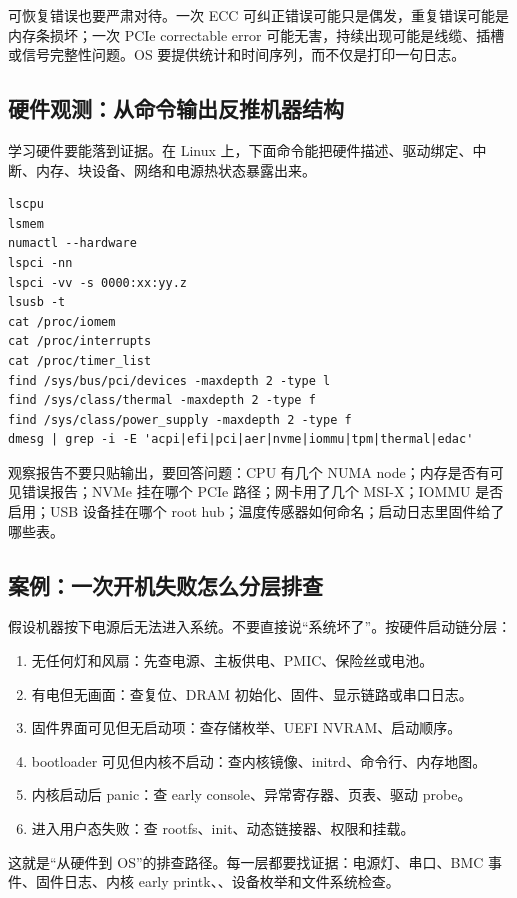 可恢复错误也要严肃对待。一次 ECC 可纠正错误可能只是偶发，重复错误可能是内存条损坏；一次 PCIe correctable error 可能无害，持续出现可能是线缆、插槽或信号完整性问题。OS 要提供统计和时间序列，而不仅是打印一句日志。

\subsection{硬件观测：从命令输出反推机器结构}

学习硬件要能落到证据。在 Linux 上，下面命令能把硬件描述、驱动绑定、中断、内存、块设备、网络和电源热状态暴露出来。

\begin{lstlisting}
lscpu
lsmem
numactl --hardware
lspci -nn
lspci -vv -s 0000:xx:yy.z
lsusb -t
cat /proc/iomem
cat /proc/interrupts
cat /proc/timer_list
find /sys/bus/pci/devices -maxdepth 2 -type l
find /sys/class/thermal -maxdepth 2 -type f
find /sys/class/power_supply -maxdepth 2 -type f
dmesg | grep -i -E 'acpi|efi|pci|aer|nvme|iommu|tpm|thermal|edac'
\end{lstlisting}

观察报告不要只贴输出，要回答问题：CPU 有几个 NUMA node；内存是否有可见错误报告；NVMe 挂在哪个 PCIe 路径；网卡用了几个 MSI-X；IOMMU 是否启用；USB 设备挂在哪个 root hub；温度传感器如何命名；启动日志里固件给了哪些表。

\subsection{案例：一次开机失败怎么分层排查}

假设机器按下电源后无法进入系统。不要直接说“系统坏了”。按硬件启动链分层：

\begin{enumerate}
\tightlist
\item 无任何灯和风扇：先查电源、主板供电、PMIC、保险丝或电池。
\item 有电但无画面：查复位、DRAM 初始化、固件、显示链路或串口日志。
\item 固件界面可见但无启动项：查存储枚举、UEFI NVRAM、启动顺序。
\item bootloader 可见但内核不启动：查内核镜像、initrd、命令行、内存地图。
\item 内核启动后 panic：查 early console、异常寄存器、页表、驱动 probe。
\item 进入用户态失败：查 rootfs、init、动态链接器、权限和挂载。
\end{enumerate}

这就是“从硬件到 OS”的排查路径。每一层都要找证据：电源灯、串口、BMC 事件、固件日志、内核 early printk、、设备枚举和文件系统检查。

